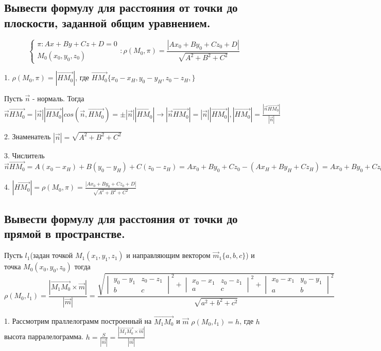 \documentclass[a4paper, 10pt]{article}
\newcommand{\bvec}[1]{\overrightarrow{#1}}
\renewcommand{\a}{\vec{a}}
\renewcommand{\b}{\vec{b}}
\begin{document}
\subsection{Вывести формулу для расстояния от точки до плоскости, заданной общим уравнением. }

$$\begin{cases}\pi:Ax + By + Cz + D =0\\M_0(x_0, y_0, z_0)\end{cases}:
    \rho (M_0, \pi) = \frac{ |Ax_0 + By_0 + Cz_0 + D| }{\sqrt{A^2+B^2+C^2}}$$

1. $\rho(M_0, \pi) = |\bvec{HM_0}|$, где $\bvec{HM_0}\{x_0-x_H,y_0-y_H,z_0-z_H,\}$

Пусть $\vec{n}$ - нормаль. Тогда $\vec{n}\bvec{HM_0} = |\vec{n}||\bvec{HM_0}|cos(\vec{n}, 
\bvec{HM_0}) = \pm|\vec{n}||\bvec{HM_0}| \rightarrow |\vec{n}\bvec{HM_0}| = 
|\vec{n}||\bvec{HM_0}|, |\bvec{HM_0}| = \frac{ |\vec{n}\bvec{HM_0}| }{ |\vec{n}| }$

2. Знаменатель $|\vec{n}| = \sqrt{A^2+B^2+C^2}$

3. Числитель $\vec{n}\bvec{HM_0} = A(x_0-x_H)+B(y_0-y_H)+C(z_0-z_H) = Ax_0 + By_0 
+ Cz_0 - (Ax_H + By_H + Cz_H) = Ax_0 + By_0 + Cz_0 + D$

4. $|\bvec{HM_0}| = \rho (M_0, \pi) = \frac{ |Ax_0 + By_0 + Cz_0 + D| }{\sqrt{A^2+B^2+C^2}}$

\subsection{Вывести формулу для расстояния от точки до прямой в пространстве.}

Пусть $l_1$(задан точкой $M_1(x_1, y_1, z_1)$ и направляющим вектором $\vec{m}_1\{a,b,c\}$) и точка 
$M_0(x_0,y_0,z_0)$ тогда 
$$\rho(M_0, l_1) = \frac{ |\bvec{M_1M_0}\times\vec{m}| }{ |\vec{m}| } = 
\frac{\sqrt{\begin{vmatrix}y_0-y_1&z_0-z_1\\b&c\end{vmatrix}^2+
\begin{vmatrix}x_0-x_1&z_0-z_1\\a&c\end{vmatrix}^2+
\begin{vmatrix}x_0-x_1&y_0-y_1\\a&b\end{vmatrix}^2}}{\sqrt{a^2+b^2+c^2}}$$

1. Рассмотрим праллелограмм построенный на  $\bvec{M_1M_0}$ и $\vec{m}$
$\rho(M_0, l_1) = h$, где $h$ высота парралелограмма.
$h = \frac{S}{ |\vec{m}| } = \frac{ |\bvec{M_1M_0} \times \vec{m}| }{ |\vec{m}| }$
\end{document}
